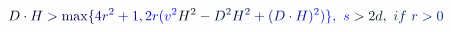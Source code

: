 \documentclass[12pt]{article}
\begin{document}
\makeatletter
\renewcommand*{\@textcolor}[3]{%
  \protect\leavevmode
  \begingroup
    \color#1{#2}#3%
  \endgroup
}
\makeatother
\begin{displaymath}
\mathcolor[RGB]{0,0,15}{D} \mathcolor[RGB]{0,0,30}{\cdot} \mathcolor[RGB]{0,0,45}{H} \mathcolor[RGB]{0,0,60}{>} \mathcolor[RGB]{0,0,75}{\max} \mathcolor[RGB]{0,0,90}{\{} \mathcolor[RGB]{0,0,105}{4} \mathcolor[RGB]{0,0,120}{r} ^ { \mathcolor[RGB]{0,0,135}{2} } \mathcolor[RGB]{0,0,150}{+} \mathcolor[RGB]{0,0,165}{1} \mathcolor[RGB]{0,0,180}{,} \mathcolor[RGB]{0,0,195}{2} \mathcolor[RGB]{0,0,210}{r} \mathcolor[RGB]{0,0,225}{(} \mathcolor[RGB]{0,0,240}{v} ^ { \mathcolor[RGB]{0,0,255}{2} } \mathcolor[RGB]{0,15,0}{H} ^ { \mathcolor[RGB]{0,15,15}{2} } \mathcolor[RGB]{0,15,30}{-} \mathcolor[RGB]{0,15,45}{D} ^ { \mathcolor[RGB]{0,15,60}{2} } \mathcolor[RGB]{0,15,75}{H} ^ { \mathcolor[RGB]{0,15,90}{2} } \mathcolor[RGB]{0,15,105}{+} \mathcolor[RGB]{0,15,120}{(} \mathcolor[RGB]{0,15,135}{D} \mathcolor[RGB]{0,15,150}{\cdot} \mathcolor[RGB]{0,15,165}{H} \mathcolor[RGB]{0,15,180}{)} ^ { \mathcolor[RGB]{0,15,195}{2} } \mathcolor[RGB]{0,15,210}{)} \mathcolor[RGB]{0,15,225}{\}} \mathcolor[RGB]{0,15,240}{,} \ \mathcolor[RGB]{0,15,255}{s} \mathcolor[RGB]{0,30,0}{>} \mathcolor[RGB]{0,30,15}{2} \mathcolor[RGB]{0,30,30}{d} \mathcolor[RGB]{0,30,45}{,} \ \mathcolor[RGB]{0,30,60}{\mbox} { \mathcolor[RGB]{0,30,75}{i} \mathcolor[RGB]{0,30,90}{f} } \ \mathcolor[RGB]{0,30,105}{r} \mathcolor[RGB]{0,30,120}{>} \mathcolor[RGB]{0,30,135}{0}
\end{displaymath}
\end{document}
